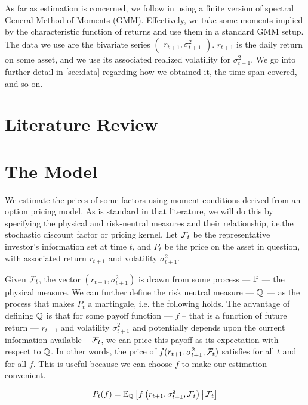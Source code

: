 \documentclass[11pt, letterpaper, twoside, final]{article}
\begin{document}
As far as estimation is concerned, we follow \textcite{khrapov2016affine} in using a finite version of spectral
General Method of Moments (GMM).
Effectively, we take some moments implied by the characteristic function of returns and use them in a standard GMM
setup.
The data we use are the bivariate series $\begin{pmatrix} r_{t+1}, \sigma^2_{t+1} \end{pmatrix}$.
$r_{t+1}$ is the daily return on some asset, and we use its associated realized volatility for $\sigma^2_{t+1}$.
We go into further detail in \cref{sec:data} regarding how we obtained it, the time-span covered, and so on.

\section{Literature Review}\label{sec:lit_review}


\section{The Model}\label{sec:model}

\addtocounter{subsection}{1}

We estimate the prices of some factors using moment conditions derived from an option pricing model. 
As is standard in that literature, we will do  this by specifying the physical and risk-neutral measures and their
relationship, i.e.\@ the stochastic discount factor or pricing kernel.
Let $\mathcal{F}_t$ be the representative investor's information set at time $t$, and $P_t$ be the price on the asset in
question, with associated return $r_{t+1}$ and volatility  $\sigma^2_{t+1}$.

Given $\mathcal{F}_{t}$, the vector $\left( r_{t+1},  \sigma^2_{t+1}\right)$ is drawn from some process --- $\mathbb{P}$ --- the
physical measure. 
We can further define the risk neutral measure --- $\mathbb{Q}$ ---  as the process that makes $P_t$ a martingale, i.e.\@
the following holds. 
The advantage of defining $\mathbb{Q}$ is that for some payoff function --- $f$  -- that is a function of future return
--- $r_{t+1}$ and volatility $\sigma^2_{t+1}$ and potentially depends upon the current information available --
$\mathcal{F}_t$, we can price this payoff as its expectation with respect to $\mathbb{Q}$.
In other  words, the price of $f(r_{t+1}, \sigma^2_{t+1}, \mathcal{F}_t)$ satisfies for all $t$ and for all $f$.
This is useful because we can choose $f$ to make our estimation convenient.

\begin{equation}
    P_t(f) = \operatorname{\mathbb{E}}_{\mathbb{Q}}\left[ f\left(r_{t+1}, \sigma^2_{t+1}, \mathcal{F}_{t}\right)  \,\middle\vert\, \mathcal{F}_{t}\right]
\end{equation}
\end{document}
